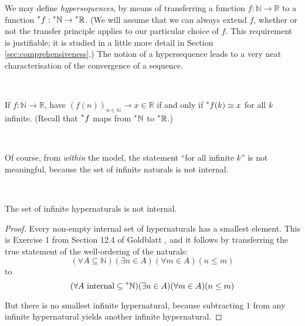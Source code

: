 \documentclass[11pt]{amsart}
\theoremstyle{remark}
\newcommand{\hyp}[1][\mathbb{R}]{\prescript{*}{}{#1}}
\newcommand{\near}{\simeq}
\begin{document}
We may define \emph{hypersequences}, by means of transferring a function $f: \mathbb{N} \to \mathbb{R}$ to a function $\hyp[f]: \hyp[\mathbb{N}] \to \hyp$.
(We will assume that we can always extend $f$, whether or not the transfer principle applies to our particular choice of $f$.
This requirement is justifiable; it is studied in a little more detail in Section \ref{sec:comprehensiveness}.)
The notion of a hypersequence leads to a very neat characterisation of the convergence of a sequence.

\

\begin{defn} \label{defn:convergence} If $f: \mathbb{N} \to \mathbb{R}$, have $(f(n))_{n \in \mathbb{N}} \to x \in \mathbb{R}$ if and only if $\hyp[f](k) \near x$ for all $k$ infinite. (Recall that $\hyp[f]$ maps from $\hyp[\mathbb{N}]$ to $\hyp$.)
\end{defn}

\

Of course, from \emph{within} the model, the statement ``for all infinite $k$'' is not meaningful, because the set of infinite naturals is not internal.

\

\begin{thm} \label{thm:infinite_not_internal}
The set of infinite hypernaturals is not internal.
\end{thm}
\begin{proof}
Every non-empty internal set of hypernaturals has a smallest element.
This is Exercise 1 from Section 12.4 of Goldblatt \cite{goldblatt}, and it follows by transferring the true statement of the well-ordering of the naturals:
$$(\forall A \subseteq \mathbb{N})(\exists n \in A)(\forall m \in A)(n \leq m)$$
to
$$(\forall \text{$A$ internal} \subseteq \hyp[\mathbb{N}])(\exists n \in A)(\forall m \in A)(n \leq m)$$

But there is no smallest infinite hypernatural, because subtracting $1$ from any infinite hypernatural yields another infinite hypernatural.
\end{proof}

\
\end{document}
